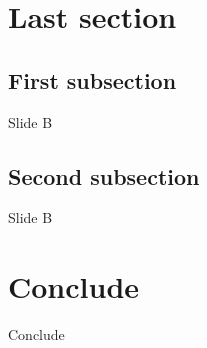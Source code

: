 	\section{Last section}
	\subsection{First subsection}
	\begin{frame}{Slide B}
	\end{frame}
	\subsection{Second subsection}
	\begin{frame}{Slide B}
	\end{frame}
	\section*{Conclude}
	\begin{frame}{Conclude}
	\end{frame}

	\begin{frame}
		\titlepage
	\end{frame}

